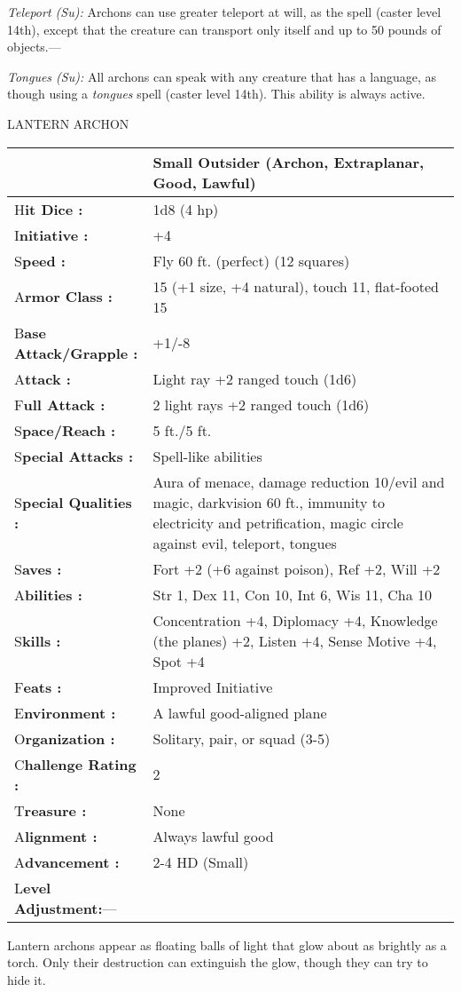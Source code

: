 \documentclass{article}
\begin{document}
\textit{Teleport (Su): }Archons can use greater teleport at will, as the spell 
(caster level 14th), except that the creature can transport only itself and up 
to 50 pounds of objects.---

\textit{Tongues (Su): }All archons can speak with any creature that has a language, 
as though using a \textit{tongues }spell (caster level 14th). This ability is always 
active.

\vspace{12pt}
LANTERN ARCHON

\begin{tabular}{|>{\raggedright}p{94pt}|>{\raggedright}p{220pt}|}
\hline
  & Small Outsider (Archon, Extraplanar, Good, Lawful)\tabularnewline
\hline
H\textbf{it Dice :} & 1d8 (4 hp)\tabularnewline
\hline
I\textbf{nitiative :} & +4\tabularnewline
\hline
S\textbf{peed :} & Fly 60 ft. (perfect) (12 squares)\tabularnewline
\hline
A\textbf{rmor Class :} & 15 (+1 size, +4 natural), touch 11, flat-footed 15\tabularnewline
\hline
B\textbf{ase Attack/Grapple :} & +1/-8\tabularnewline
\hline
A\textbf{ttack :} & Light ray +2 ranged touch (1d6)\tabularnewline
\hline
F\textbf{ull Attack :} & 2 light rays +2 ranged touch (1d6)\tabularnewline
\hline
S\textbf{pace/Reach :} & 5 ft./5 ft.\tabularnewline
\hline
S\textbf{pecial Attacks :} & Spell-like abilities\tabularnewline
\hline
S\textbf{pecial Qualities :} & Aura of menace, damage reduction 10/evil and magic, 
darkvision 60 ft., immunity to electricity and petrification, magic circle against 
evil, teleport, tongues\tabularnewline
\hline
S\textbf{aves :} & Fort +2 (+6 against poison), Ref +2, Will +2\tabularnewline
\hline
A\textbf{bilities :} & Str 1, Dex 11, Con 10, Int 6, Wis 11, Cha 10\tabularnewline
\hline
S\textbf{kills :} & Concentration +4, Diplomacy +4, Knowledge (the planes) +2, 
Listen +4, Sense Motive +4, Spot +4\tabularnewline
\hline
F\textbf{eats :} & Improved Initiative\tabularnewline
\hline
E\textbf{nvironment :} & A lawful good-aligned plane\tabularnewline
\hline
O\textbf{rganization :} & Solitary, pair, or squad (3-5)\tabularnewline
\hline
C\textbf{hallenge Rating :} & 2\tabularnewline
\hline
T\textbf{reasure :} & None\tabularnewline
\hline
A\textbf{lignment :} & Always lawful good\tabularnewline
\hline
A\textbf{dvancement :} & 2-4 HD (Small)\tabularnewline
\hline
L\textbf{evel Adjustment:}--- & \tabularnewline
\hline
\end{tabular}

Lantern archons appear as floating balls of light that glow about as brightly as 
a torch. Only their destruction can extinguish the glow, though they can try to 
hide it.
\end{document}
